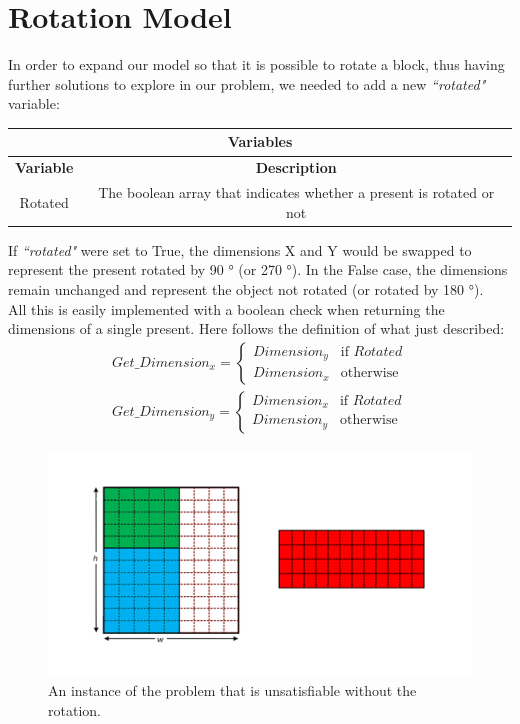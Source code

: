 \section{Rotation Model}
In order to expand our model so that it is possible to rotate a block, thus having further solutions to explore in our problem, we needed to add a new \textit{``rotated"} variable:
\begin{center}
	\begin{adjustwidth}{-0.3cm}{}
		\begin{tabular}{|c|c|}
			\hline
			\multicolumn{2}{|c|}{\textbf{Variables}} \\
			\hline
			\textbf{Variable} & {\textbf{Description}} \\
			\hline
			Rotated & The boolean array that indicates whether a present is rotated or not \\
			\hline
		\end{tabular}
	\end{adjustwidth}
\end{center}
If \textit{``rotated"} were set to True, the dimensions X and Y would be swapped to represent the present rotated by 90 ° (or 270 °). In the False case, the dimensions remain unchanged and represent the object not rotated (or rotated by 180 °). \\
All this is easily implemented with a boolean check when returning the dimensions of a single present.
Here follows the definition of what just described:\\
\begin{equation*}\begin{split}
    Get\_Dimension_x = 
    \begin{cases}
        Dimension_y & \text{if } Rotated \\
        Dimension_x & \text{otherwise}
    \end{cases} \\
    Get\_Dimension_y = 
    \begin{cases}
        Dimension_x & \text{if } Rotated \\
        Dimension_y & \text{otherwise}
    \end{cases}
\end{split}\end{equation*}

\begin{figure}[ht]
	\centering
	\includegraphics[width=\textwidth]{images/rotated_problem.png}
	\caption{An instance of the problem that is unsatisfiable without the rotation.}
	\label{fig:overlaps}
\end{figure}

